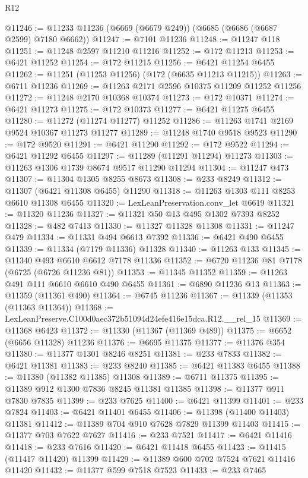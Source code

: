 \begin{lexlean}{R12}
\begin{coremodule}
@11246 := @11233 @11236 (@6669 (@6679 @249)) (@6685 (@6686 (@6687 @2599) @7180 @6662))
@11247 := @7101 @11236
@11248 := @11247 @118
@11251 := @11248 @2597 @11210 @11216
@11252 := @172 @11213
@11253 := @6421 @11252
@11254 := @172 @11215
@11256 := @6421 @11254 @6455
@11262 := @11251 (@11253 @11256) (@172 (@6635 @11213 @11215))
@11263 := @6711 @11236
@11269 := @11263 @2171 @2596 @10375 @11209 @11252 @11256
@11272 := @11248 @2170 @10368 @10374
@11273 := @172 @10371
@11274 := @6421 @11273
@11275 := @172 @10373
@11277 := @6421 @11275 @6455
@11280 := @11272 (@11274 @11277) @11252
@11286 := @11263 @1741 @2169 @9524 @10367 @11273 @11277
@11289 := @11248 @1740 @9518 @9523
@11290 := @172 @9520
@11291 := @6421 @11290
@11292 := @172 @9522
@11294 := @6421 @11292 @6455
@11297 := @11289 (@11291 @11294) @11273
@11303 := @11263 @1306 @1739 @8674 @9517 @11290 @11294
@11304 := @11247 @473
@11307 := @11304 @1305 @8255 @8673
@11308 := @233 @8249
@11312 := @11307 (@6421 @11308 @6455) @11290
@11318 := @11263 @1303 @111 @8253 @6610 @11308 @6455
@11320 := LexLeanPreservation.conv_let @6619
@11321 := @11320 @11236
@11327 := @11321 @50 @13 @495 @1302 @7393 @8252
@11328 := @482 @7413
@11330 := @11327 @11328 @11308
@11331 := @11247 @479
@11334 := @11331 @494 @6613 @7392
@11336 := @6421 @490 @6455
@11339 := @11334 (@7179 @11336) @11328
@11340 := @11263 @133
@11345 := @11340 @493 @6610 @6612 @7178 @11336
@11352 := @6720 @11236 @81 @7178 (@6725 (@6726 @11236 @81))
@11353 := @11345 @11352
@11359 := @11263 @491 @111 @6610 @6610 @490 @6455
@11361 := @6890 @11236 @13
@11363 := @11359 (@11361 @490)
@11364 := @6745 @11236
@11367 := @11339 (@11353 (@11363 @11364))
@11368 := LexLeanPreserve.C100d0aec372b51094d24efe416e15dca.R12.__rel_15
@11369 := @11368 @6423
@11372 := @11330 (@11367 (@11369 @489))
@11375 := @6652 (@6656 @11328) @11236
@11376 := @6695 @11375
@11377 := @11376 @354
@11380 := @11377 @1301 @8246 @8251
@11381 := @233 @7833
@11382 := @6421 @11381
@11383 := @233 @8240
@11385 := @6421 @11383 @6455
@11388 := @11380 (@11382 @11385) @11308
@11389 := @6711 @11375
@11395 := @11389 @912 @1300 @7836 @8245 @11381 @11385
@11398 := @11377 @911 @7830 @7835
@11399 := @233 @7625
@11400 := @6421 @11399
@11401 := @233 @7824
@11403 := @6421 @11401 @6455
@11406 := @11398 (@11400 @11403) @11381
@11412 := @11389 @704 @910 @7628 @7829 @11399 @11403
@11415 := @11377 @703 @7622 @7627
@11416 := @233 @7521
@11417 := @6421 @11416
@11418 := @233 @7616
@11420 := @6421 @11418 @6455
@11423 := @11415 (@11417 @11420) @11399
@11429 := @11389 @600 @702 @7524 @7621 @11416 @11420
@11432 := @11377 @599 @7518 @7523
@11433 := @233 @7465

\end{coremodule}
\end{lexlean}
